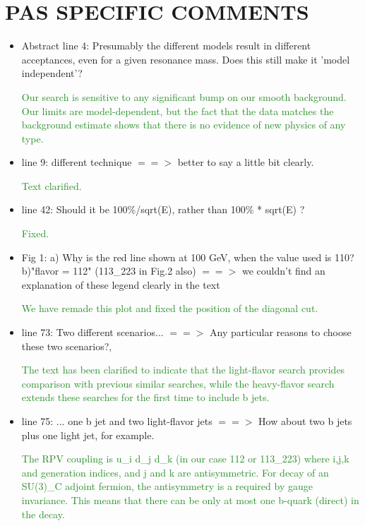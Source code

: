 \documentclass[paper=a4, fontsize=11pt]{scrartcl}
\begin{document}
\section{PAS SPECIFIC COMMENTS}
\begin{itemize}
\item Abstract line 4: Presumably the different models result in different acceptances, even for a given resonance mass. Does this still make it 'model independent'?

\textcolor{ForestGreen}{Our search is sensitive to any significant bump on our
smooth background. Our limits are model-dependent, but the fact that the data
matches the background estimate shows that there is no evidence of new physics
of any type.}\\

\item line 9: different technique $==>$ better to say a little bit clearly.

\textcolor{ForestGreen}{Text clarified.}\\

\item line 42: Should it be 100\%/sqrt(E), rather than 100\% * sqrt(E) ?

\textcolor{ForestGreen}{Fixed.}\\

\item Fig 1: a) Why is the red line shown at 100 GeV, when the value used is 110? b)"flavor = 112" (113\_223 in Fig.2 also) $==>$ we couldn't find an explanation of these legend clearly in the text

\textcolor{ForestGreen}{We have remade this plot and fixed the position of the diagonal cut.}\\

\item line 73: Two different scenarios... $==>$ Any particular reasons to choose these two scenarios?,

\textcolor{ForestGreen}{The text has been clarified to indicate that the
light-flavor search provides comparison with previous similar searches,
while the heavy-flavor search extends these searches for the first time to
include b jets.}\\


\item line 75: ... one b jet and two light-flavor jets $==>$ How about two b jets plus one light jet, for example.

\textcolor{ForestGreen}{The RPV coupling is u\_i d\_j d\_k  (in our case 112 or 113\_223) where i,j,k and
generation indices, and j and k are antisymmetric.
For decay of an SU(3)\_C adjoint fermion, the antisymmetry is a required by gauge invariance.
This means that there can be only at most one b-quark (direct) in the decay.}\\


\end{itemize}
\end{document}
